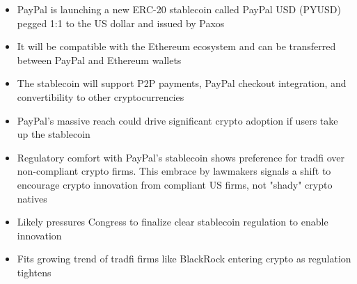 \begin{itemize}
\item PayPal is launching a new ERC-20 stablecoin called PayPal USD (PYUSD) pegged 1:1 to the US dollar and issued by Paxos
\item It will be compatible with the Ethereum ecosystem and can be transferred between PayPal and Ethereum wallets
\item The stablecoin will support P2P payments, PayPal checkout integration, and convertibility to other cryptocurrencies
\item PayPal's massive reach could drive significant crypto adoption if users take up the stablecoin
\item Regulatory comfort with PayPal's stablecoin shows preference for tradfi over non-compliant crypto firms. This embrace by lawmakers signals a shift to encourage crypto innovation from compliant US firms, not "shady" crypto natives
\item Likely pressures Congress to finalize clear stablecoin regulation to enable innovation
\item Fits growing trend of tradfi firms like BlackRock entering crypto as regulation tightens
\end{itemize}



